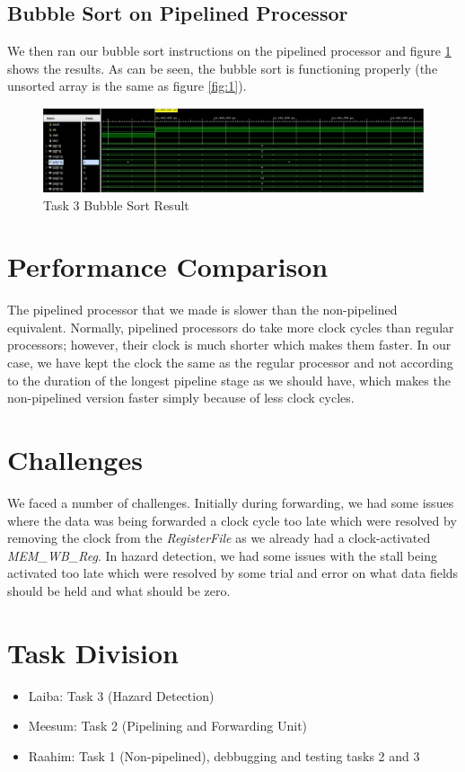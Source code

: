 \documentclass[12pt]{article}
\begin{document}
    \subsection{Bubble Sort on Pipelined Processor}
        We then ran our bubble sort instructions on the pipelined processor and figure \ref{fig:4} shows the results. As can be seen, the bubble sort is functioning properly (the unsorted array is the same as figure \ref{fig:1}).

      
    \begin{figure}
        \centering
        \includegraphics[width=\textwidth]{success.JPG}
        \caption{Task 3 Bubble Sort Result}
        \label{fig:4}
    \end{figure}
    
\newpage

\section{Performance Comparison}
    The pipelined processor that we made is slower than the non-pipelined equivalent. Normally, pipelined processors do take more clock cycles than regular processors; however, their clock is much shorter which makes them faster. In our case, we have kept the clock the same as the regular processor and not according to the duration of the longest pipeline stage as we should have, which makes the non-pipelined version faster simply because of less clock cycles.

\section{Challenges}
    We faced a number of challenges. Initially during forwarding, we had some issues where the data was being forwarded a clock cycle too late which were resolved by removing the clock from the \textit{RegisterFile} as we already had a clock-activated \textit{MEM\_WB\_Reg}. In hazard detection, we had some issues with the stall being activated too late which were resolved by some trial and error on what data fields should be held and what should be zero.

\section{Task Division}
    \begin{itemize}
        \item Laiba: Task 3 (Hazard Detection)
        \item Meesum: Task 2 (Pipelining and Forwarding Unit)
        \item Raahim: Task 1 (Non-pipelined), debbugging and testing tasks 2 and 3
    \end{itemize}
    
\end{document}
